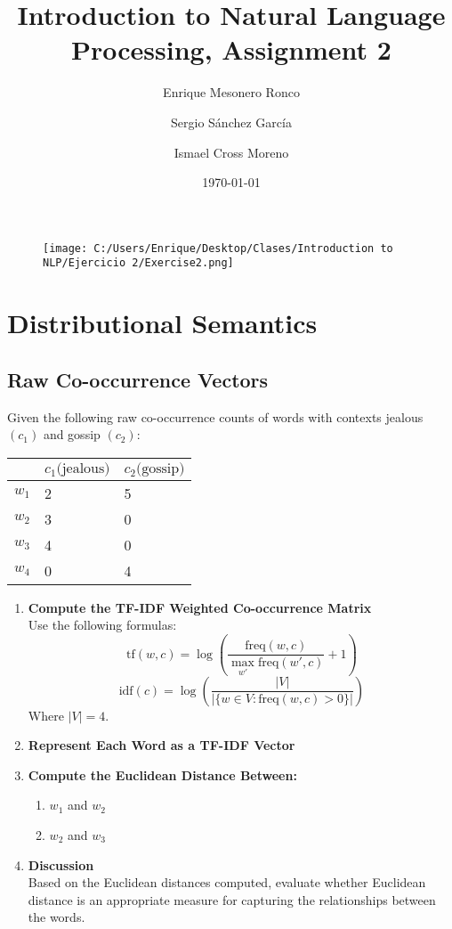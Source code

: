 \documentclass{article}
\title{ Introduction to Natural Language Processing, Assignment 2 }
\author{ Enrique Mesonero Ronco \and Sergio Sánchez García \and Ismael Cross Moreno }
\date{\today}
\begin{document}
\maketitle
\begin{figure}[h!]
	\texttt{[image: C:/Users/Enrique/Desktop/Clases/Introduction to NLP/Ejercicio 2/Exercise2.png]}
\end{figure}
\newpage
\tableofcontents
\newpage
\section { Distributional Semantics }
	\subsection { Raw Co-occurrence Vectors }
Given the following raw co-occurrence counts of words with contexts jealous
$(c_1)$ and gossip $(c_2)$:

	\begin{center}
	\begin{tabular} { | m{2cm} | m{2cm} | m{2cm} | }
		\hline
		 & $c_1 \text{(jealous)}$ &  $c_2 \text{(gossip)} $\\
		\hline
		$w_1$ & 2 & 5 \\
		\hline
		$w_2$ & 3 & 0 \\
		\hline
		$w_3$ & 4 & 0 \\
		\hline
		$w_4$ & 0 & 4 \\
		\hline
	\end{tabular}
	\end{center}

\begin{enumerate}
    \item \textbf{Compute the TF-IDF Weighted Co-occurrence Matrix} \\
    Use the following formulas:
    \[
    \text{tf}(w, c) = \log \left( \frac{\text{freq}(w, c)}{\max_{w'} \text{freq}(w', c)} + 1 \right)
    \]
    \[
    \text{idf}(c) = \log \left( \frac{|V|}{|\{w \in V : \text{freq}(w, c) > 0\}|} \right)
    \]
    Where $|V| = 4$.
    
    \item \textbf{Represent Each Word as a TF-IDF Vector}
    
    \item \textbf{Compute the Euclidean Distance Between:}
    \begin{enumerate}
        \item $w_1$ and $w_2$
        \item $w_2$ and $w_3$
    \end{enumerate}
    
    \item \textbf{Discussion} \\
    Based on the Euclidean distances computed, evaluate whether Euclidean distance is an appropriate measure for capturing the relationships between the words.
\end{enumerate}
\end{document}
